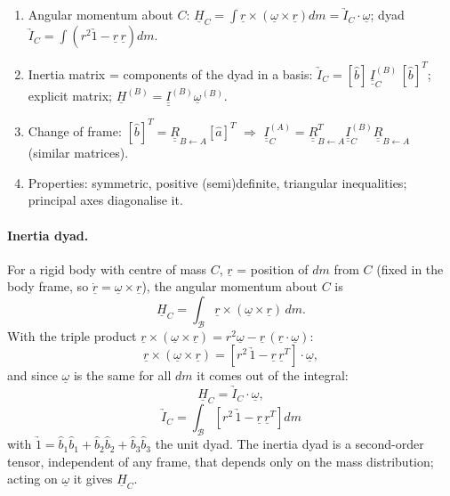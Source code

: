 \begin{outline}
\begin{enumerate}
\item Angular momentum about $C$: $\underline H_C=\int\underline r\times(\underline\omega\times\underline r)dm=\underrightarrow I_C\cdot\underline\omega$; dyad $\underrightarrow I_C=\int(r^2\underrightarrow1-\underline r\,\underline r)dm$.
\item Inertia matrix = components of the dyad in a basis: $\underrightarrow I_C=[\hat b]\,\underline{\underline I}_C^{(B)}\,[\hat b]^T$; explicit matrix; $\underline H^{(B)}=\underline{\underline I}^{(B)}\underline\omega^{(B)}$.
\item Change of frame: $[\hat b]^T=\underline{\underline R}_{B\leftarrow A}[\hat a]^T$ $\Rightarrow$ $\underline{\underline I}_C^{(A)}=\underline{\underline R}_{B\leftarrow A}^T\underline{\underline I}_C^{(B)}\underline{\underline R}_{B\leftarrow A}$ (similar matrices).
\item Properties: symmetric, positive (semi)definite, triangular inequalities; principal axes diagonalise it.
\end{enumerate}
\end{outline}

\answer
\paragraph{Inertia dyad.} For a rigid body with centre of mass $C$, $\underline r$ = position of $dm$ from $C$ (fixed in the body frame, so
$\dot{\underline r}=\underline\omega\times\underline r$), the angular momentum about $C$ is
\begin{equation}
\underline H_C=\int_{\mathcal B}\underline r\times(\underline\omega\times\underline r)\,dm .
\end{equation}
With the triple product $\underline r\times(\underline\omega\times\underline r)=r^2\underline\omega-\underline r\,(\underline r\cdot\underline\omega)$:
\begin{equation}
\underline r\times(\underline\omega\times\underline r)=\left[r^2\,\underrightarrow{1}-\underline r\,\underline r^T\right]\cdot\underline\omega,
\end{equation}
and since $\underline\omega$ is the same for all $dm$ it comes out of the integral:
\begin{equation}
\underline H_C=\underrightarrow{I}_C\cdot\underline\omega,
\end{equation}
\begin{equation}
\boxed{\;\underrightarrow{I}_C=\int_{\mathcal B}\left[r^2\,\underrightarrow{1}-\underline r\,\underline r^T\right]dm\;}
\end{equation}
with $\underrightarrow1=\hat b_1\hat b_1+\hat b_2\hat b_2+\hat b_3\hat b_3$ the unit dyad. The inertia dyad is a second-order tensor,
independent of any frame, that depends only on the mass distribution; acting on $\underline\omega$ it gives $\underline H_C$.

